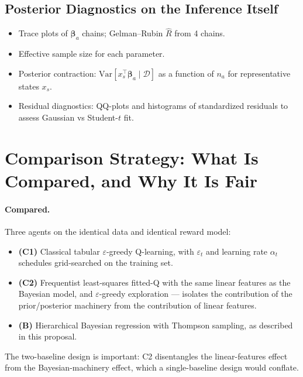 \documentclass[11pt]{article}
\newcommand{\Var}{\mathrm{Var}}
\newcommand{\D}{\mathcal{D}}
\begin{document}
\subsection{Posterior Diagnostics on the Inference Itself}
\begin{itemize}[leftmargin=*]
\item Trace plots of $\bm\beta_a$ chains; Gelman--Rubin $\hat R$ from 4 chains.
\item Effective sample size for each parameter.
\item Posterior contraction: $\Var[x_s^\top \bm\beta_a \mid \D]$ as a function of $n_a$ for representative states $x_s$.
\item Residual diagnostics: QQ-plots and histograms of standardized residuals to assess Gaussian vs Student-$t$ fit.
\end{itemize}

\section{Comparison Strategy: What Is Compared, and Why It Is Fair}

\paragraph{Compared.} Three agents on the identical data and identical reward model:
\begin{itemize}[leftmargin=*]
\item \textbf{(C1)} Classical tabular $\varepsilon$-greedy Q-learning, with $\varepsilon_t$ and learning rate $\alpha_t$ schedules grid-searched on the training set.
\item \textbf{(C2)} Frequentist least-squares fitted-Q with the same linear features as the Bayesian model, and $\varepsilon$-greedy exploration --- isolates the contribution of the prior/posterior machinery from the contribution of linear features.
\item \textbf{(B)} Hierarchical Bayesian regression with Thompson sampling, as described in this proposal.
\end{itemize}
The two-baseline design is important: C2 disentangles the linear-features effect from the Bayesian-machinery effect, which a single-baseline design would conflate.
\end{document}
